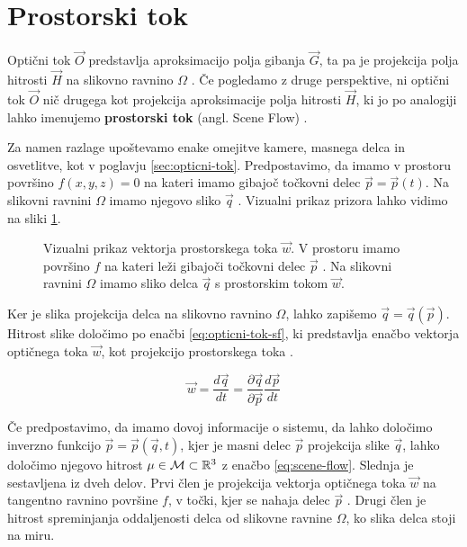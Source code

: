\section{Prostorski tok}
Optični tok $\vec{O}$ predstavlja aproksimacijo polja gibanja $\vec{G}$, ta pa je projekcija polja hitrosti $\vec{H}$ na slikovno ravnino $\mathit{\Omega}$ \cite{trucco1998introductory}. Če pogledamo z druge perspektive, ni optični tok $\vec{O}$ nič drugega kot projekcija aproksimacije polja hitrosti $\vec{H}$, ki jo po analogiji lahko imenujemo \textbf{prostorski tok} (angl. Scene Flow) \cite{vedula1999three}. 

Za namen razlage upoštevamo enake omejitve kamere, masnega delca in osvetlitve, kot v poglavju \ref{sec:opticni-tok}. Predpostavimo, da imamo v prostoru površino $f(x,y,z) = 0$ na kateri imamo gibajoč točkovni delec $\vec{p} = \vec{p}(t)$. Na slikovni ravnini $\mathit{\Omega}$ imamo njegovo sliko $\vec{q}$ \cite{vedula1999three}. Vizualni prikaz prizora lahko vidimo na sliki \ref{fig:scene-flow}. 




\begin{figure}[htb]
\centering

\caption[Vizualni prikaz vektorja prostorskega toka $\vec{w}$]{Vizualni prikaz vektorja prostorskega toka $\vec{w}$. V prostoru imamo površino $f$ na kateri leži gibajoči točkovni delec $\vec{p}$ \cite{vedula1999three}. Na slikovni ravnini $\mathit{\Omega}$ imamo sliko delca $\vec{q}$ s prostorskim tokom $\vec{w}$.}
\label{fig:scene-flow}
\end{figure}



Ker je slika projekcija delca na slikovno ravnino $\mathit{\Omega}$, lahko zapišemo $\vec{q} = \vec{q}(\vec{p})$. Hitrost slike določimo po enačbi \eqref{eq:opticni-tok-sf}, ki predstavlja enačbo vektorja optičnega toka $\vec{w}$, kot projekcijo prostorskega toka \cite{vedula1999three}. 


\begin{equation}\label{eq:opticni-tok-sf}
	\vec{w} = \frac{d\vec{q}}{dt} = \frac{\partial \vec{q}}{\partial \vec{p}}\frac{d\vec{p}}{dt}
\end{equation}

Če predpostavimo, da imamo dovoj informacije o sistemu, da lahko določimo inverzno funkcijo $\vec{p} = \vec{p}(\vec{q},t)$, kjer je masni delec $\vec{p}$ projekcija slike $\vec{q}$, lahko določimo njegovo hitrost $\mathbf{\mu} \in \mathcal{M} \subset \mathbb{R}^3$ z enačbo \eqref{eq:scene-flow}. Slednja je sestavljena iz dveh delov. Prvi člen je projekcija vektorja optičnega toka $\vec{w}$ na tangentno ravnino površine $f$, v točki, kjer se nahaja delec $\vec{p}$ \cite{vedula1999three}. Drugi člen je hitrost spreminjanja oddaljenosti delca od slikovne ravnine $\mathit{\Omega}$, ko slika delca stoji na miru. 

